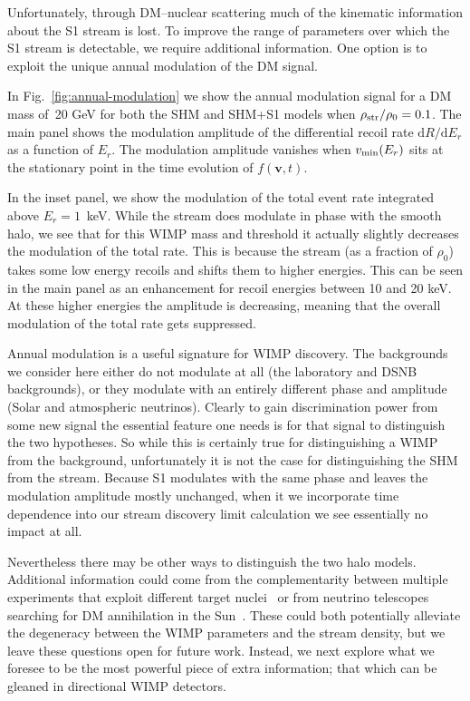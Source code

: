 \documentclass[prd,10pt,twocolumn,showpacs,nofootinbib,aps,superscriptaddress,preprintnumbers]{revtex4-1}
\begin{document}
 Unfortunately, through DM--nuclear scattering much of the kinematic information about the S1 stream is lost. 
 To improve the range of parameters over which the S1 stream is detectable, we require additional information.
 One option is to exploit the unique annual modulation of the DM signal.
 
 In Fig.~\ref{fig:annual-modulation} we show the annual
modulation signal for a DM mass of~20 GeV for
both the SHM and SHM+S1 models when $\rho_{\rm str}/\rho_0=0.1$.
 The main panel shows the modulation 
amplitude of the differential recoil rate
$\textrm{d}R/\textrm{d}E_r$ as a function of $E_r$. The
modulation amplitude vanishes when
$v_{\rm min}(E_r)$ sits at the stationary point in the time evolution of $f(\mathbf{v},t)$. 

 In the inset panel, we show the modulation of the total event rate
integrated above $E_r = 1$~keV. While the stream does modulate
in phase with the smooth halo, we see that for this WIMP mass and
threshold it actually slightly decreases the modulation of the total
rate. This is because the stream (as a fraction of $\rho_0$) takes
some low energy recoils and shifts them to higher energies. This can be
 seen in the main panel as an enhancement for recoil energies between 10 and 20 keV. 
At these
higher energies the amplitude is decreasing, meaning that
the overall modulation of the total rate gets suppressed. 

Annual modulation is a useful signature for WIMP discovery. The backgrounds we consider here either do not modulate at all (the laboratory and DSNB backgrounds), or they modulate with an entirely different phase and amplitude (Solar and atmospheric neutrinos). Clearly to gain discrimination power from some new signal the essential feature one needs is for that signal to distinguish the two hypotheses. So while this is certainly true for distinguishing a WIMP from the background, unfortunately it is not the case for distinguishing the SHM from the stream. Because S1 modulates with the same phase and leaves the modulation amplitude mostly unchanged, when it we incorporate time dependence into our stream discovery limit calculation we see essentially no impact at all.

Nevertheless there may be other ways to distinguish the two halo models. Additional information could come from the 
complementarity between multiple experiments that exploit different target nuclei~\cite{Pato:2010zk,Peter:2013aha} 
or from neutrino telescopes searching for DM annihilation in the Sun~\cite{Kavanagh:2014rya,Ibarra:2018yxq}. 
These could both potentially alleviate the degeneracy between the WIMP parameters and the stream density, 
but we leave these questions open for future work. Instead, we next explore what we foresee to be the most powerful piece of extra information; that which can be gleaned in directional WIMP detectors.
\end{document}
